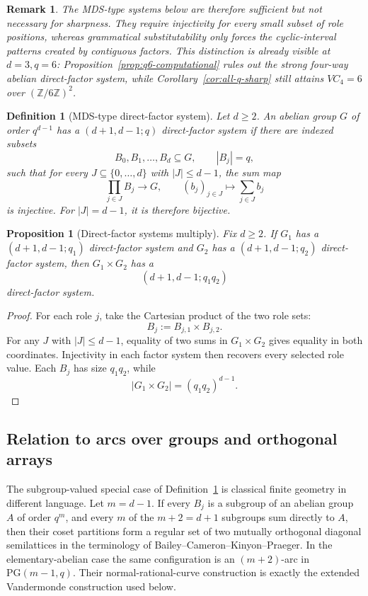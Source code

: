 \documentclass[11pt]{article}
\newtheorem{proposition}[theorem]{Proposition}
\newtheorem{definition}[theorem]{Definition}
\newtheorem{remark}[theorem]{Remark}
\begin{document}
\begin{remark}
The MDS-type systems below are therefore sufficient but not necessary for
sharpness. They require injectivity for every small subset of role positions,
whereas grammatical substitutability only forces the cyclic-interval
patterns created by contiguous factors. This distinction is already visible
at \(d=3,q=6\): Proposition~\ref{prop:q6-computational} rules out the
strong four-way abelian direct-factor system, while
Corollary~\ref{cor:all-q-sharp} still attains \(VC_4=6\) over
\((\mathbb Z/6\mathbb Z)^2\).
\end{remark}
\begin{definition}[MDS-type direct-factor system]
\label{def:mds-factor}
Let \(d\ge2\).  An abelian group \(G\) of order \(q^{d-1}\) has a
\emph{\((d+1,d-1;q)\) direct-factor system} if there are indexed subsets
\[
 B_0,B_1,\ldots,B_d\subseteq G,\qquad |B_j|=q,
\]
such that for every \(J\subseteq\{0,\ldots,d\}\) with
\(|J|\le d-1\), the sum map
\[
 \prod_{j\in J} B_j\longrightarrow G,\qquad
 (b_j)_{j\in J}\longmapsto\sum_{j\in J}b_j
\]
is injective.
For \(|J|=d-1\), it is therefore bijective.
\end{definition}

\begin{proposition}[Direct-factor systems multiply]
\label{prop:factor-product}
Fix \(d\ge2\).  If \(G_1\) has a
\((d+1,d-1;q_1)\) direct-factor system and \(G_2\) has a
\((d+1,d-1;q_2)\) direct-factor system, then \(G_1\times G_2\) has a
\[
 (d+1,d-1;q_1q_2)
\]
direct-factor system.
\end{proposition}

\begin{proof}
For each role \(j\), take the Cartesian product of the two role sets:
\[
 B_j:=B_{j,1}\times B_{j,2}.
\]
For any \(J\) with \(|J|\le d-1\), equality of two sums in
\(G_1\times G_2\) gives equality in both coordinates.  Injectivity in each
factor system then recovers every selected role value.  Each \(B_j\) has
size \(q_1q_2\), while
\[
 |G_1\times G_2|
 =(q_1q_2)^{d-1}.
\]
\end{proof}

\subsection{Relation to arcs over groups and orthogonal arrays}

The subgroup-valued special case of
Definition~\ref{def:mds-factor} is classical finite geometry in different
language.  Let \(m=d-1\).  If every \(B_j\) is a subgroup of an abelian group
\(A\) of order \(q^m\), and every \(m\) of the \(m+2=d+1\) subgroups sum
directly to \(A\), then their coset partitions form a regular set of two
mutually orthogonal diagonal semilattices in the terminology of
Bailey--Cameron--Kinyon--Praeger.  In the elementary-abelian case the same
configuration is an \((m+2)\)-arc in
\(\mathrm{PG}(m-1,q)\).  Their normal-rational-curve construction is exactly
the extended Vandermonde construction used below.
\end{document}
